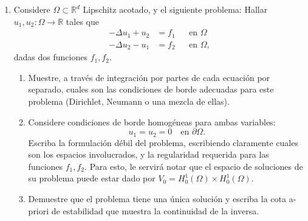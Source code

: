 \documentclass{article}
\newcommand{\R}{\mathbb{R}}
\begin{document}
\begin{enumerate}
        \item Considere $\Omega\subset \R^d$ Lipschitz acotado, y el siguiente problema: Hallar $u_1, u_2:\Omega \to \R$  tales que
            $$ 
            \begin{aligned}
                -\Delta u_1 + u_2 &= f_1  && \text{en $\Omega$} \\
                -\Delta u_2 - u_1 &= f_2  && \text{en $\Omega$},
            \end{aligned}
            $$
            dadas dos funciones $f_1,f_2$. 
            \begin{enumerate}
                \item Muestre, a través de integración por partes de cada ecuación por separado, cuales son las condiciones de borde adecuadas para este problema (Dirichlet, Neumann o una mezcla de ellas). 
                \item Considere condiciones de borde homogéneas para ambas variables: 
                        $$ u_1 = u_2 = 0 \quad\text{en $\partial\Omega$}. $$
                       Escriba la formulación débil del problema, escribiendo claramente cuales son los espacios involucrados, y la regularidad requerida para las funciones $f_1, f_2$. Para esto, le servirá notar que el espacio de soluciones de su problema puede estar dado por $V_0 = H_0^1(\Omega)\times H_0^1(\Omega)$. 
                   \item Demuestre que el problema tiene una única solución y escriba la cota a-priori de estabilidad que muestra la continuidad de la inversa. 
            \end{enumerate}


\end{enumerate}
\end{document}
